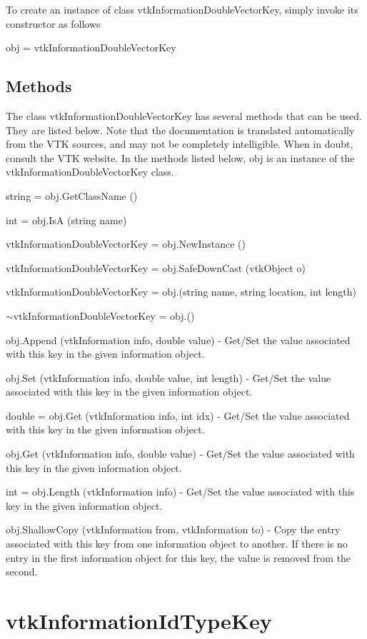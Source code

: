 To create an instance of class vtk\-Information\-Double\-Vector\-Key, simply invoke its constructor as follows \begin{DoxyVerb}  obj = vtkInformationDoubleVectorKey
\end{DoxyVerb}
 \hypertarget{vtkwidgets_vtkxyplotwidget_Methods}{}\subsection{Methods}\label{vtkwidgets_vtkxyplotwidget_Methods}
The class vtk\-Information\-Double\-Vector\-Key has several methods that can be used. They are listed below. Note that the documentation is translated automatically from the V\-T\-K sources, and may not be completely intelligible. When in doubt, consult the V\-T\-K website. In the methods listed below, {\ttfamily obj} is an instance of the vtk\-Information\-Double\-Vector\-Key class. 
\begin{DoxyItemize}
\item {\ttfamily string = obj.\-Get\-Class\-Name ()}  
\item {\ttfamily int = obj.\-Is\-A (string name)}  
\item {\ttfamily vtk\-Information\-Double\-Vector\-Key = obj.\-New\-Instance ()}  
\item {\ttfamily vtk\-Information\-Double\-Vector\-Key = obj.\-Safe\-Down\-Cast (vtk\-Object o)}  
\item {\ttfamily vtk\-Information\-Double\-Vector\-Key = obj.(string name, string location, int length)}  
\item {\ttfamily $\sim$vtk\-Information\-Double\-Vector\-Key = obj.()}  
\item {\ttfamily obj.\-Append (vtk\-Information info, double value)} -\/ Get/\-Set the value associated with this key in the given information object.  
\item {\ttfamily obj.\-Set (vtk\-Information info, double value, int length)} -\/ Get/\-Set the value associated with this key in the given information object.  
\item {\ttfamily double = obj.\-Get (vtk\-Information info, int idx)} -\/ Get/\-Set the value associated with this key in the given information object.  
\item {\ttfamily obj.\-Get (vtk\-Information info, double value)} -\/ Get/\-Set the value associated with this key in the given information object.  
\item {\ttfamily int = obj.\-Length (vtk\-Information info)} -\/ Get/\-Set the value associated with this key in the given information object.  
\item {\ttfamily obj.\-Shallow\-Copy (vtk\-Information from, vtk\-Information to)} -\/ Copy the entry associated with this key from one information object to another. If there is no entry in the first information object for this key, the value is removed from the second.  
\end{DoxyItemize}\hypertarget{vtkcommon_vtkinformationidtypekey}{}\section{vtk\-Information\-Id\-Type\-Key}\label{vtkcommon_vtkinformationidtypekey}
